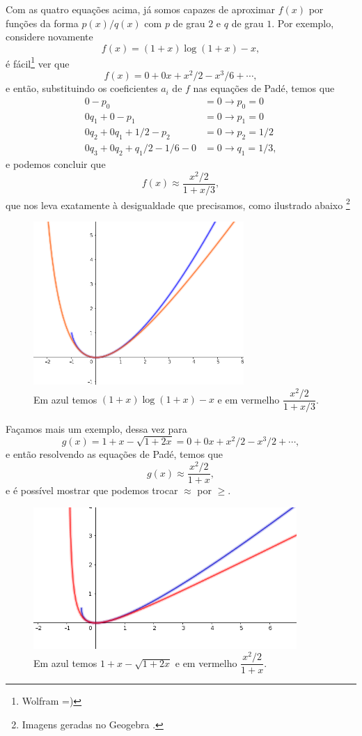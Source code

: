 \documentclass[12pt,a4paper,oneside]{book}
\theoremstyle{definition}
\theoremstyle{remark}
\numberwithin{equation}{section}
\begin{document}
Com as quatro equações acima, já somos capazes de aproximar $f(x)$ por  funções da forma $p(x)/q(x)$ com $p$ de grau $2$ e $q$ de grau $1$. Por exemplo, considere novamente
$$ f(x)=(1+x)\log(1+x)-x,$$
é fácil\footnote{Wolfram =)} ver que
$$f(x) = 0 + 0x + x^2/2 - x^3/6 + \cdots, $$
e então, substituindo os coeficientes $a_i$ de $f$ nas equações de Padé, temos que
 \begin{align*}
0-p_0&=0 \longrightarrow p_0 = 0\\
0q_1+0-p_1&=0 \longrightarrow p_1 = 0\\
0q_2+0q_1+1/2-p_2 &= 0\longrightarrow p_2 = 1/2\\
0q_3+0q_2+q_1/2-1/6-0&=0\longrightarrow q_1 = 1/3,
\end{align*}
e podemos concluir que
$$f(x) \approx \dfrac{x^2/2}{1+x/3}, $$
que nos leva exatamente à desigualdade que precisamos, como ilustrado abaixo \footnote{Imagens geradas no Geogebra \cite{geogebra}.} 
\begin{figure}[h]
\centering %
\includegraphics[width=8cm]{1xl1x-x} %
\caption{Em azul temos $(1+x)\log(1+x)-x$ e em vermelho $\dfrac{x^2/2}{1+x/3}$.}
\end{figure}
 



Façamos mais um exemplo, dessa vez para 
$$g(x) = 1+x - \sqrt{1+2x} = 0 + 0x + x^2/2 - x^3/2 + \cdots,$$ e então resolvendo as equações de Padé, temos que
$$g(x)\approx \dfrac{x^2/2}{1+x}, $$
e é possível mostrar que podemos trocar $\approx$ por $\geq$. 

\begin{figure}[h]
\centering %
\includegraphics[width=10cm]{1xsqrt} %
\caption{Em azul temos $1+x - \sqrt{1+2x}$ e em vermelho $ \dfrac{x^2/2}{1+x}$. }
\end{figure}
 
\end{document}
